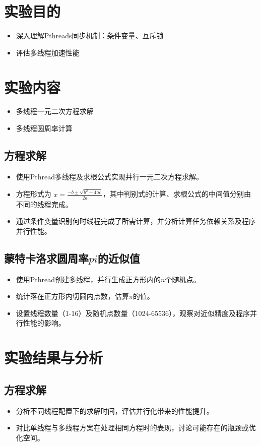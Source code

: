 \section{实验目的}
\begin{itemize}
    \item 深入理解Pthreads同步机制：条件变量、互斥锁
    \item 评估多线程加速性能
\end{itemize}

\section{实验内容}
\begin{itemize}
    \item 多线程一元二次方程求解
    \item 多线程圆周率计算
\end{itemize}

\subsection{方程求解}
\begin{itemize}
   \item 使用Pthread多线程及求根公式实现并行一元二次方程求解。
    \item 方程形式为 $x = \frac{-b\pm\sqrt{b^2-4ac}}{2a}$，其中判别式的计算、求根公式的中间值分别由不同的线程完成。
    \item 通过条件变量识别何时线程完成了所需计算，并分析计算任务依赖关系及程序并行性能。
    \end{itemize}
\subsection{蒙特卡洛求圆周率$pi$的近似值}
\begin{itemize}
   \item 使用Pthread创建多线程，并行生成正方形内的$n$个随机点。
    \item 统计落在正方形内切圆内点数，估算$\pi$的值。
    \item 设置线程数量（1-16）及随机点数量（1024-65536），观察对近似精度及程序并行性能的影响。
\end{itemize}



\section{实验结果与分析}
\subsection{方程求解}
\begin{itemize}
    \item 分析不同线程配置下的求解时间，评估并行化带来的性能提升。
    \item 对比单线程与多线程方案在处理相同方程时的表现，讨论可能存在的瓶颈或优化空间。
\end{itemize}
